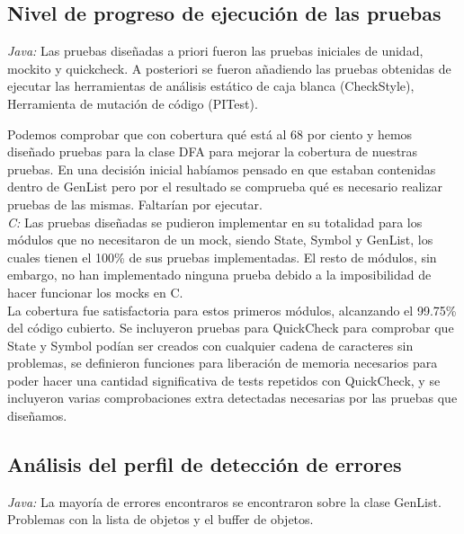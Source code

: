 \documentclass[DIV=calc,paper=a4,fontsize=11pt,onecolumn]{scrartcl} %
\begin{document}
  	\subsection{Nivel de progreso de ejecución de las pruebas}
  	
  	\textit{Java: }Las pruebas diseñadas a priori fueron las pruebas iniciales de unidad, mockito y quickcheck.  	
  	A posteriori se fueron añadiendo las pruebas obtenidas de ejecutar las herramientas de análisis estático de caja blanca (CheckStyle), Herramienta de mutación de código (PITest).
  	
  	Podemos comprobar que con cobertura qué está al 68 por ciento y hemos diseñado pruebas para la clase DFA para mejorar la cobertura de nuestras pruebas. En una decisión inicial habíamos pensado en que estaban contenidas dentro de GenList pero por el resultado se comprueba qué es necesario realizar pruebas de las mismas. Faltarían por ejecutar. \\
  	
  	\textit{C:} Las pruebas diseñadas se pudieron implementar en su totalidad para los módulos que no necesitaron de un mock, siendo State, Symbol y GenList, los cuales tienen el 100\% de sus pruebas implementadas. El resto de módulos, sin embargo, no han implementado ninguna prueba debido a la imposibilidad de hacer funcionar los mocks en C. \\
  	
  	La cobertura fue satisfactoria para estos primeros módulos, alcanzando el 99.75\% del código cubierto. Se incluyeron pruebas para QuickCheck para comprobar que State y Symbol podían ser creados con cualquier cadena de caracteres sin problemas, se definieron funciones para liberación de memoria necesarios para poder hacer una cantidad significativa de tests repetidos con QuickCheck, y se incluyeron varias comprobaciones extra detectadas necesarias por las pruebas que diseñamos. 
  	
  	\subsection{Análisis del perfil de detección de errores}
  	\textit{Java:} La mayoría de errores encontraros se encontraron sobre la clase GenList. Problemas con la lista de objetos y el buffer de objetos. \\
  	
\end{document}

